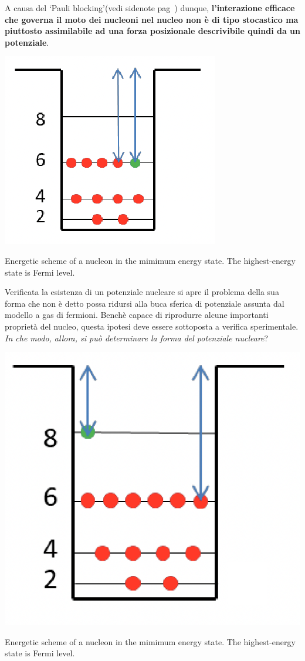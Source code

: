 A causa del `Pauli blocking’(vedi sidenote pag~\pageref{siden:pauli-blocking}) dunque, \textbf{l’interazione efficace che governa il moto dei nucleoni nel nucleo non è di tipo stocastico ma piuttosto assimilabile ad una forza posizionale descrivibile quindi da un potenziale}.
\bigskip
\begin{marginfigure}
	\includegraphics{figs/energy-level-shell1}
	\caption{Energetic scheme of a nucleon in the mimimum energy state. The highest-energy state is Fermi level.}
	\label{fig:energy-level-shell1}
\end{marginfigure}
Verificata la esistenza di un potenziale nucleare si apre il problema della sua forma che non è detto possa ridursi alla buca sferica di potenziale assunta dal modello a gas di fermioni.
Benchè capace di riprodurre alcune importanti proprietà del nucleo, questa ipotesi deve essere sottoposta a verifica sperimentale. \emph{In che modo, allora, si può determinare la forma del potenziale nucleare}?
\begin{marginfigure}
	\includegraphics{figs/energy-level-shell2}
	\caption{Energetic scheme of a nucleon in the mimimum energy state. The highest-energy state is Fermi level.}
	\label{fig:energy-level-shell2}
\end{marginfigure}
